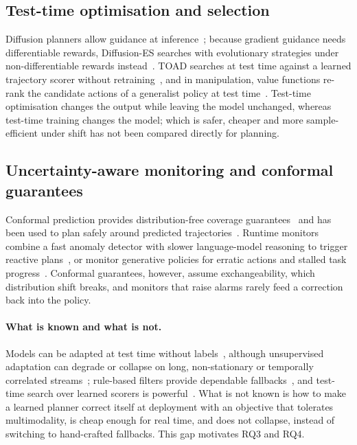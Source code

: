 \subsection{Test-time optimisation and selection}

Diffusion planners allow guidance at inference~\cite{janner2022diffuser}; because gradient guidance needs differentiable rewards, Diffusion-ES searches with evolutionary strategies under non-differentiable rewards instead~\cite{yang2024diffusiones}. TOAD searches at test time against a learned trajectory scorer without retraining~\cite{xu2026toad}, and in manipulation, value functions re-rank the candidate actions of a generalist policy at test time~\cite{nakamoto2024vgps}. Test-time optimisation changes the output while leaving the model unchanged, whereas test-time training changes the model; which is safer, cheaper and more sample-efficient under shift has not been compared directly for planning.

\subsection{Uncertainty-aware monitoring and conformal guarantees}

Conformal prediction provides distribution-free coverage guarantees~\cite{angelopoulos2023gentle} and has been used to plan safely around predicted trajectories~\cite{lindemann2023safe}. Runtime monitors combine a fast anomaly detector with slower language-model reasoning to trigger reactive plans~\cite{sinha2024realtime}, or monitor generative policies for erratic actions and stalled task progress~\cite{agia2024unpacking}. Conformal guarantees, however, assume exchangeability, which distribution shift breaks, and monitors that raise alarms rarely feed a correction back into the policy.

\paragraph{What is known and what is not.} Models can be adapted at test time without labels~\cite{sun2020ttt,wang2021tent,zhang2022memo}, although unsupervised adaptation can degrade or collapse on long, non-stationary or temporally correlated streams~\cite{gong2022note,press2023rdumb}; rule-based filters provide dependable fallbacks~\cite{vitelli2022safetynet,hsu2024safetyfilter}, and test-time search over learned scorers is powerful~\cite{xu2026toad}. What is not known is how to make a learned planner correct itself at deployment with an objective that tolerates multimodality, is cheap enough for real time, and does not collapse, instead of switching to hand-crafted fallbacks. This gap motivates RQ3 and RQ4.


